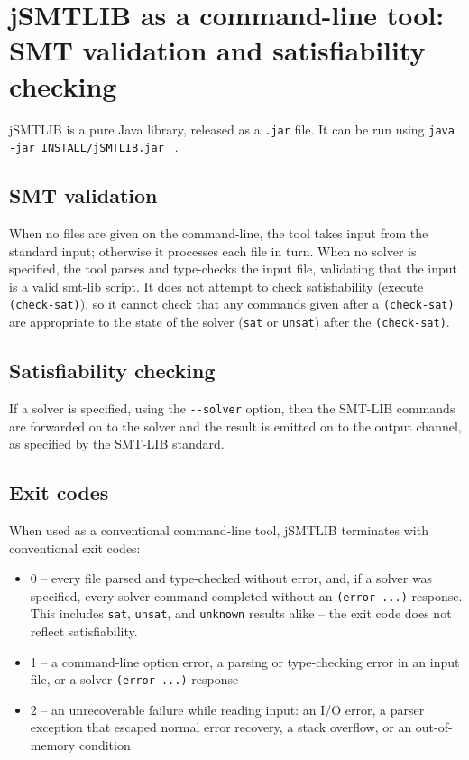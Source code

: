 \documentclass[12pt,oneside]{report}
\begin{document}
\chapter{jSMTLIB as a command-line tool: SMT validation and satisfiability checking}

jSMTLIB is a pure Java library, released as a \texttt{.jar} file. It can be run using 
\texttt{java -jar INSTALL/jSMTLIB.jar } .

\section{SMT validation}
When no files are given on the command-line, the tool takes input from the standard input; otherwise it processes each file in turn.
When no solver is specified,  the tool parses and type-checks the input file,  validating that the input is a valid smt-lib
script.  It does not attempt to check satisfiability (execute \texttt{(check-sat)}), so it cannot check that any commands given after a \texttt{(check-sat)} 
are appropriate to the state of the solver (\texttt{sat} or \texttt{unsat}) after the \texttt{(check-sat)}.

\section{Satisfiability checking}
If a solver is specified, using the \texttt{-{}-solver} option, then the SMT-LIB commands are forwarded on to the solver and the result is emitted on to
the output channel, as specified by the SMT-LIB standard.


\section{Exit codes}

When used as a conventional command-line tool, jSMTLIB terminates with conventional exit codes:
\begin{itemize}
\item 0 -- every file parsed and type-checked without error, and, if a solver was specified, every solver command completed without an \texttt{(error ...)} response. This includes \texttt{sat}, \texttt{unsat}, and \texttt{unknown} results alike -- the exit code does not reflect satisfiability.
\item 1 -- a command-line option error, a parsing or type-checking error in an input file, or a solver \texttt{(error ...)} response
\item 2 -- an unrecoverable failure while reading input: an I/O error, a parser exception that escaped normal error recovery, a stack overflow, or an out-of-memory condition
\end{itemize}
\end{document}
